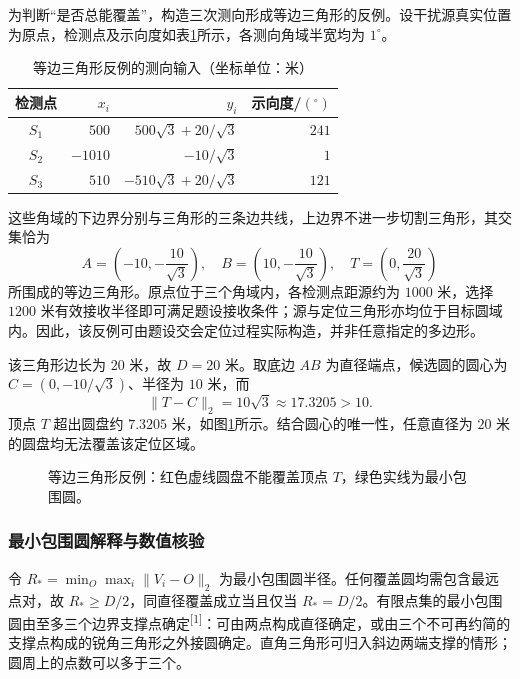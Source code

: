 为判断“是否总能覆盖”，构造三次测向形成等边三角形的反例。设干扰源真实位置为原点，检测点及示向度如表\ref{tab:cov-input}所示，各测向角域半宽均为 $1^\circ$。
\begin{table}[H]
\centering
\caption{等边三角形反例的测向输入（坐标单位：米）}\label{tab:cov-input}
\begin{tabular}{crrr}
\toprule
检测点 & $x_i$ & $y_i$ & 示向度/$(^\circ)$\\
\midrule
$S_1$ & $500$ & $500\sqrt3+20/\sqrt3$ & $241$\\
$S_2$ & $-1010$ & $-10/\sqrt3$ & $1$\\
$S_3$ & $510$ & $-510\sqrt3+20/\sqrt3$ & $121$\\
\bottomrule
\end{tabular}
\end{table}
这些角域的下边界分别与三角形的三条边共线，上边界不进一步切割三角形，其交集恰为
\begin{equation}
A=\left(-10,-\frac{10}{\sqrt3}\right),\quad
B=\left(10,-\frac{10}{\sqrt3}\right),\quad
T=\left(0,\frac{20}{\sqrt3}\right)
\end{equation}
所围成的等边三角形。原点位于三个角域内，各检测点距源约为 $1000$ 米，选择 $1200$ 米有效接收半径即可满足题设接收条件；源与定位三角形亦均位于目标圆域内。因此，该反例可由题设交会定位过程实际构造，并非任意指定的多边形。

\coveragepagebreak

该三角形边长为 $20$ 米，故 $D=20$ 米。取底边 $AB$ 为直径端点，候选圆的圆心为 $C=(0,-10/\sqrt3)$、半径为 $10$ 米，而
\begin{equation}
\|T-C\|_2=10\sqrt3\approx17.3205>10.
\end{equation}
顶点 $T$ 超出圆盘约 $7.3205$ 米，如图\ref{fig:cov-counterexample}所示。结合圆心的唯一性，任意直径为 $20$ 米的圆盘均无法覆盖该定位区域。

\begin{figure}[H]
\centering

\caption{等边三角形反例：红色虚线圆盘不能覆盖顶点 $T$，绿色实线为最小包围圆。}\label{fig:cov-counterexample}
\end{figure}

\subsubsection*{最小包围圆解释与数值核验}

令 $R_*=\min_O\max_i\|V_i-O\|_2$ 为最小包围圆半径。任何覆盖圆均需包含最远点对，故 $R_*\ge D/2$，同直径覆盖成立当且仅当 $R_*=D/2$。有限点集的最小包围圆由至多三个边界支撑点确定\textsuperscript{[1]}：可由两点构成直径确定，或由三个不可再约简的支撑点构成的锐角三角形之外接圆确定。直角三角形可归入斜边两端支撑的情形；圆周上的点数可以多于三个。

